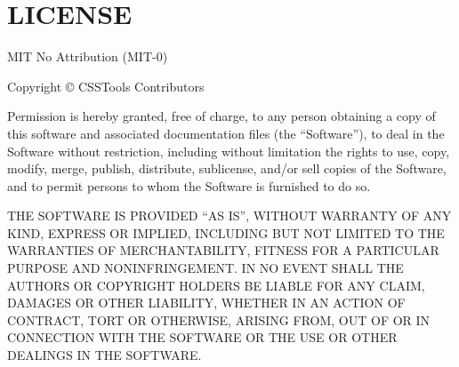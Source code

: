 \chapter{LICENSE}
\hypertarget{md_node__modules_2_0dcsstools_2color-helpers_2_l_i_c_e_n_s_e}{}\label{md_node__modules_2_0dcsstools_2color-helpers_2_l_i_c_e_n_s_e}
MIT No Attribution (MIT-\/0)

Copyright © CSSTools Contributors

Permission is hereby granted, free of charge, to any person obtaining a copy of this software and associated documentation files (the “\+Software”), to deal in the Software without restriction, including without limitation the rights to use, copy, modify, merge, publish, distribute, sublicense, and/or sell copies of the Software, and to permit persons to whom the Software is furnished to do so.

THE SOFTWARE IS PROVIDED “\+AS IS”, WITHOUT WARRANTY OF ANY KIND, EXPRESS OR IMPLIED, INCLUDING BUT NOT LIMITED TO THE WARRANTIES OF MERCHANTABILITY, FITNESS FOR A PARTICULAR PURPOSE AND NONINFRINGEMENT. IN NO EVENT SHALL THE AUTHORS OR COPYRIGHT HOLDERS BE LIABLE FOR ANY CLAIM, DAMAGES OR OTHER LIABILITY, WHETHER IN AN ACTION OF CONTRACT, TORT OR OTHERWISE, ARISING FROM, OUT OF OR IN CONNECTION WITH THE SOFTWARE OR THE USE OR OTHER DEALINGS IN THE SOFTWARE. 